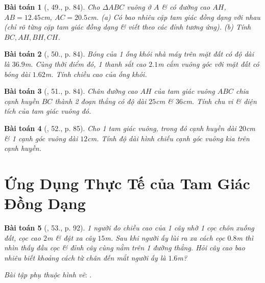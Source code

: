 \documentclass{article}
\newtheorem{baitoan}{Bài toán}
\begin{document}
\begin{baitoan}[\cite{SGK_Toan_8_tap_2}, 49., p. 84]
	Cho $\Delta ABC$ vuông ở $A$ \& có đường cao $AH$, $AB = 12.45$\emph{cm}, $AC = 20.5$\emph{cm}. (a) Có bao nhiêu cặp tam giác đồng dạng với nhau (chỉ rõ từng cặp tam giác đồng dạng \& viết theo các đỉnh tương ứng). (b) Tính $BC,AH,BH,CH$.
\end{baitoan}

\begin{baitoan}[\cite{SGK_Toan_8_tap_2}, 50., p. 84]
	Bóng của 1 ống khói nhà máy trên mặt đất có độ dài là $36.9$\emph{m}. Cùng thời điểm đó, 1 thanh sắt cao $2.1$\emph{m} cắm vuông góc với mặt đất có bóng dài $1.62$\emph{m}. Tính chiều cao của ống khói.
\end{baitoan}

\begin{baitoan}[\cite{SGK_Toan_8_tap_2}, 51., p. 84]
	Chân đường cao $AH$ của tam giác vuông $ABC$ chia cạnh huyền $BC$ thành 2 đoạn thẳng có độ dài $25$\emph{cm} \& $36$\emph{cm}. Tính chu vi \& diện tích của tam giác vuông đó.
\end{baitoan}

\begin{baitoan}[\cite{SGK_Toan_8_tap_2}, 52., p. 85]
	Cho 1 tam giác vuông, trong đó cạnh huyền dài $20$\emph{cm} \& 1 cạnh góc vuông dài $12$\emph{cm}. Tính độ dài hình chiếu cạnh góc vuông kia trên cạnh huyền.
\end{baitoan}


\section{Ứng Dụng Thực Tế của Tam Giác Đồng Dạng}

\begin{baitoan}[\cite{SGK_Toan_8_tap_2}, 53., p. 92]
	1  người đo chiều cao của 1 cây nhờ 1 cọc chôn xuống đất, cọc cao $2$\emph{m} \& đặt xa cây $15$\emph{m}. Sau khi người ấy lùi ra xa cách cọc $0.8$\emph{m} thì nhìn thấy đầu cọc \& đỉnh cây cùng nằm trên 1 đường thẳng. Hỏi cây cao bao nhiêu biết khoảng cách từ chân đến mắt người ấy là $1.6$\emph{m}?
\end{baitoan}
\noindent\textit{Bài tập phụ thuộc hình vẽ}: \cite[54.--55., p. 87]{SGK_Toan_8_tap_2}.

\end{document}
